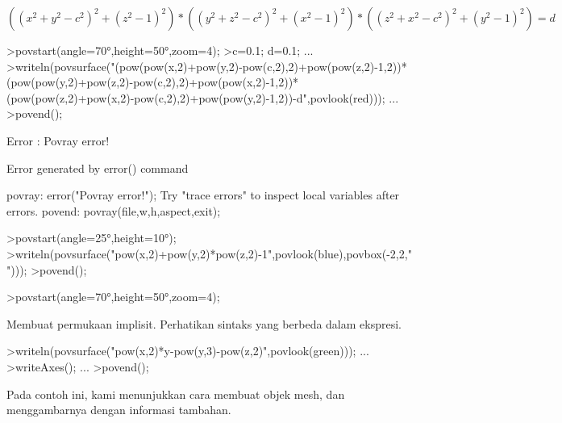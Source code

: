 \documentclass[a4paper,10pt]{article}
\begin{document}
\begin{eulernotebook}
\begin{eulercomment}
\begin{eulercomment}
\begin{eulercomment}
\begin{eulercomment}
\begin{eulercomment}
\begin{eulercomment}
\begin{eulercomment}
\begin{eulercomment}
\begin{eulercomment}
\begin{eulercomment}
\begin{eulercomment}
\end{eulercomment}
\begin{eulerformula}
\[
((x^2+y^2-c^2)^2+(z^2-1)^2)*((y^2+z^2-c^2)^2+(x^2-1)^2)*((z^2+x^2-c^2)^2+(y^2-1)^2)=d
\]
\end{eulerformula}
\begin{eulerprompt}
>povstart(angle=70°,height=50°,zoom=4);
>c=0.1; d=0.1; ...
>writeln(povsurface("(pow(pow(x,2)+pow(y,2)-pow(c,2),2)+pow(pow(z,2)-1,2))*(pow(pow(y,2)+pow(z,2)-pow(c,2),2)+pow(pow(x,2)-1,2))*(pow(pow(z,2)+pow(x,2)-pow(c,2),2)+pow(pow(y,2)-1,2))-d",povlook(red))); ...
>povend();
\end{eulerprompt}
\begin{euleroutput}
  Error : Povray error!
  
  Error generated by error() command
  
  povray:
      error("Povray error!");
  Try "trace errors" to inspect local variables after errors.
  povend:
      povray(file,w,h,aspect,exit); 
\end{euleroutput}
\begin{eulerprompt}
>povstart(angle=25°,height=10°); 
>writeln(povsurface("pow(x,2)+pow(y,2)*pow(z,2)-1",povlook(blue),povbox(-2,2,"")));
>povend();
\end{eulerprompt}
\begin{eulerprompt}
>povstart(angle=70°,height=50°,zoom=4);
\end{eulerprompt}
\begin{eulercomment}
Membuat permukaan implisit. Perhatikan sintaks yang berbeda dalam
ekspresi.
\end{eulercomment}
\begin{eulerprompt}
>writeln(povsurface("pow(x,2)*y-pow(y,3)-pow(z,2)",povlook(green))); ...
>writeAxes(); ...
>povend();
\end{eulerprompt}
\begin{eulercomment}
Pada contoh ini, kami menunjukkan cara membuat objek mesh, dan
menggambarnya dengan informasi tambahan.


\end{eulercomment}
\end{eulercomment}
\end{eulercomment}
\end{eulercomment}
\end{eulercomment}
\end{eulercomment}
\end{eulercomment}
\end{eulercomment}
\end{eulercomment}
\end{eulercomment}
\end{eulercomment}
\end{eulernotebook}
\end{document}

